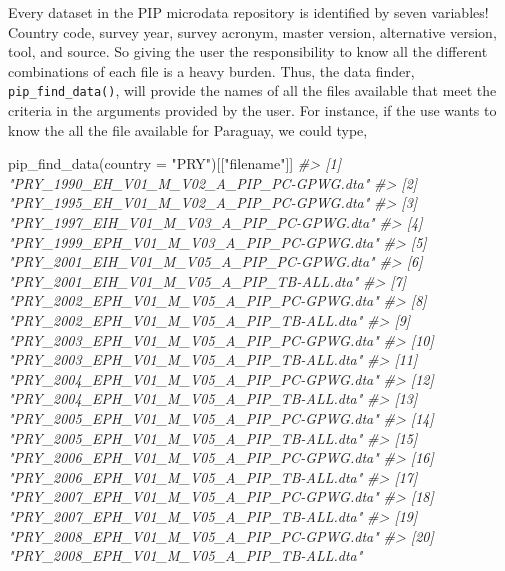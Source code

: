\documentclass[
]{book}
\newenvironment{Shaded}{\begin{snugshade}}{\end{snugshade}}
\newcommand{\AttributeTok}[1]{\textcolor[rgb]{0.77,0.63,0.00}{#1}}
\newcommand{\CommentTok}[1]{\textcolor[rgb]{0.56,0.35,0.01}{\textit{#1}}}
\newcommand{\FunctionTok}[1]{\textcolor[rgb]{0.00,0.00,0.00}{#1}}
\newcommand{\NormalTok}[1]{#1}
\newcommand{\StringTok}[1]{\textcolor[rgb]{0.31,0.60,0.02}{#1}}
\begin{document}
Every dataset in the PIP microdata repository is identified by seven variables! Country code, survey year, survey acronym, master version, alternative version, tool, and source. So giving the user the responsibility to know all the different combinations of each file is a heavy burden. Thus, the data finder, \texttt{pip\_find\_data()}, will provide the names of all the files available that meet the criteria in the arguments provided by the user. For instance, if the use wants to know the all the file available for Paraguay, we could type,

\begin{Shaded}
\begin{Highlighting}[]
\FunctionTok{pip\_find\_data}\NormalTok{(}\AttributeTok{country =} \StringTok{"PRY"}\NormalTok{)[[}\StringTok{"filename"}\NormalTok{]]}
\CommentTok{\#\textgreater{}  [1] "PRY\_1990\_EH\_V01\_M\_V02\_A\_PIP\_PC{-}GPWG.dta" }
\CommentTok{\#\textgreater{}  [2] "PRY\_1995\_EH\_V01\_M\_V02\_A\_PIP\_PC{-}GPWG.dta" }
\CommentTok{\#\textgreater{}  [3] "PRY\_1997\_EIH\_V01\_M\_V03\_A\_PIP\_PC{-}GPWG.dta"}
\CommentTok{\#\textgreater{}  [4] "PRY\_1999\_EPH\_V01\_M\_V03\_A\_PIP\_PC{-}GPWG.dta"}
\CommentTok{\#\textgreater{}  [5] "PRY\_2001\_EIH\_V01\_M\_V05\_A\_PIP\_PC{-}GPWG.dta"}
\CommentTok{\#\textgreater{}  [6] "PRY\_2001\_EIH\_V01\_M\_V05\_A\_PIP\_TB{-}ALL.dta" }
\CommentTok{\#\textgreater{}  [7] "PRY\_2002\_EPH\_V01\_M\_V05\_A\_PIP\_PC{-}GPWG.dta"}
\CommentTok{\#\textgreater{}  [8] "PRY\_2002\_EPH\_V01\_M\_V05\_A\_PIP\_TB{-}ALL.dta" }
\CommentTok{\#\textgreater{}  [9] "PRY\_2003\_EPH\_V01\_M\_V05\_A\_PIP\_PC{-}GPWG.dta"}
\CommentTok{\#\textgreater{} [10] "PRY\_2003\_EPH\_V01\_M\_V05\_A\_PIP\_TB{-}ALL.dta" }
\CommentTok{\#\textgreater{} [11] "PRY\_2004\_EPH\_V01\_M\_V05\_A\_PIP\_PC{-}GPWG.dta"}
\CommentTok{\#\textgreater{} [12] "PRY\_2004\_EPH\_V01\_M\_V05\_A\_PIP\_TB{-}ALL.dta" }
\CommentTok{\#\textgreater{} [13] "PRY\_2005\_EPH\_V01\_M\_V05\_A\_PIP\_PC{-}GPWG.dta"}
\CommentTok{\#\textgreater{} [14] "PRY\_2005\_EPH\_V01\_M\_V05\_A\_PIP\_TB{-}ALL.dta" }
\CommentTok{\#\textgreater{} [15] "PRY\_2006\_EPH\_V01\_M\_V05\_A\_PIP\_PC{-}GPWG.dta"}
\CommentTok{\#\textgreater{} [16] "PRY\_2006\_EPH\_V01\_M\_V05\_A\_PIP\_TB{-}ALL.dta" }
\CommentTok{\#\textgreater{} [17] "PRY\_2007\_EPH\_V01\_M\_V05\_A\_PIP\_PC{-}GPWG.dta"}
\CommentTok{\#\textgreater{} [18] "PRY\_2007\_EPH\_V01\_M\_V05\_A\_PIP\_TB{-}ALL.dta" }
\CommentTok{\#\textgreater{} [19] "PRY\_2008\_EPH\_V01\_M\_V05\_A\_PIP\_PC{-}GPWG.dta"}
\CommentTok{\#\textgreater{} [20] "PRY\_2008\_EPH\_V01\_M\_V05\_A\_PIP\_TB{-}ALL.dta" }

\end{Highlighting}
\end{Shaded}
\end{document}

